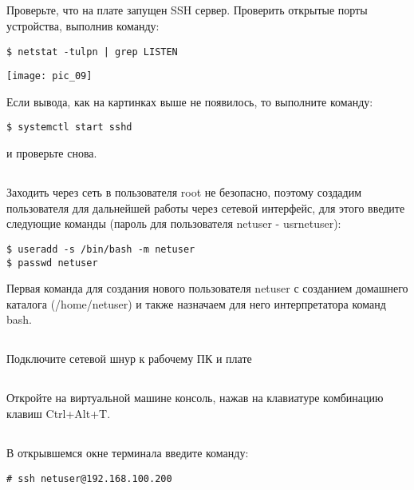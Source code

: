 \subsection{}Проверьте, что на плате запущен SSH сервер. Проверить открытые порты устройства, выполнив команду: 

\begin{lstlisting}[style=bash]
$ netstat -tulpn | grep LISTEN
\end{lstlisting} 
\begin{center}
	\texttt{[image: pic\_09]}
\end{center}
Если вывода, как на картинках выше не появилось, то выполните команду: 
\begin{lstlisting}[style=bash]
$ systemctl start sshd 
\end{lstlisting}
и проверьте снова. 

\subsection{}\label{lab2:ref1}Заходить через сеть в пользователя root не безопасно, поэтому создадим пользователя для дальнейшей работы через сетевой интерфейс, для этого введите следующие команды (пароль для пользователя netuser - usrnetuser):
\begin{lstlisting}[style=bash]
$ useradd -s /bin/bash -m netuser
$ passwd netuser
\end{lstlisting}

Первая команда для создания нового пользователя netuser с созданием домашнего каталога (/home/netuser) и также назначаем для него интерпретатора команд bash. 

\subsection{}Подключите сетевой шнур к рабочему ПК и плате

\subsection{}Откройте на виртуальной машине консоль, нажав на клавиатуре комбинацию клавиш Ctrl+Alt+T. 

\subsection{}\label{lab2:ref2}В открывшемся окне терминала введите команду: 
\begin{lstlisting}[style=bash]
# ssh netuser@192.168.100.200
\end{lstlisting}

